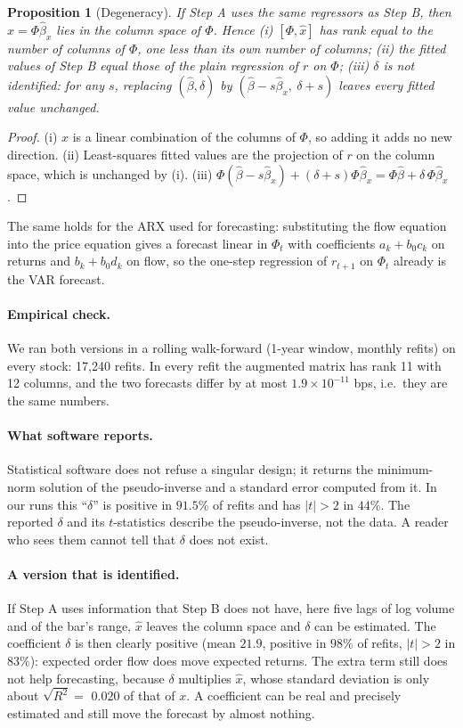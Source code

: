 \documentclass[11pt,a4paper]{article}
\newtheorem{proposition}{Proposition}
\begin{document}
\begin{proposition}[Degeneracy]
\label{prop:twostep}
If Step A uses the same regressors as Step B, then $\hat x = \Phi\hat\beta_x$ lies in the column space of
$\Phi$. Hence (i) $[\Phi,\hat x]$ has rank equal to the number of columns of $\Phi$, one less than its own
number of columns; (ii) the fitted values of Step B equal those of the plain regression of $r$ on $\Phi$;
(iii) $\delta$ is not identified: for any $s$, replacing $(\hat\beta,\delta)$ by
$(\hat\beta - s\hat\beta_x,\ \delta+s)$ leaves every fitted value unchanged.
\end{proposition}
\begin{proof}
(i) $\hat x$ is a linear combination of the columns of $\Phi$, so adding it adds no new direction.
(ii) Least-squares fitted values are the projection of $r$ on the column space, which is unchanged by (i).
(iii) $\Phi(\hat\beta-s\hat\beta_x)+(\delta+s)\Phi\hat\beta_x = \Phi\hat\beta+\delta\,\Phi\hat\beta_x$.
\end{proof}

The same holds for the ARX used for forecasting: substituting the flow equation into the price equation
gives a forecast linear in $\Phi_t$ with coefficients $a_k+b_0c_k$ on returns and $b_k+b_0d_k$ on flow, so
the one-step regression of $r_{t+1}$ on $\Phi_t$ already is the VAR forecast.

\paragraph{Empirical check.} We ran both versions in a rolling walk-forward (1-year window, monthly
refits) on every stock: 17{,}240 refits. In every refit the augmented matrix has rank 11
with 12 columns, and the two forecasts differ by at most $1.9\times10^{-11}$ bps, i.e.\ they are the
same numbers.

\paragraph{What software reports.} Statistical software does not refuse a singular design; it returns
the minimum-norm solution of the pseudo-inverse and a standard error computed from it. In our runs this
``$\delta$'' is positive in $91.5\%$ of refits and has $|t|>2$ in $44\%$. The reported $\delta$ and its $t$-statistics describe the pseudo-inverse, not the data. A reader who sees them cannot tell that $\delta$ does not exist.

\paragraph{A version that is identified.} If Step A uses information that Step B does not have, here five
lags of log volume and of the bar's range, $\hat x$ leaves the column space and $\delta$ can be estimated. The coefficient $\delta$ is then clearly positive (mean $21.9$, positive in $98\%$ of refits, $|t|>2$ in $83\%$):
expected order flow does move expected returns. The extra term still does not help forecasting, because $\delta$
multiplies $\hat x$, whose standard deviation is only about $\sqrt{R^2}=$ $0.020$ of that of $x$. A
coefficient can be real and precisely estimated and still move the forecast by almost nothing.
\end{document}
